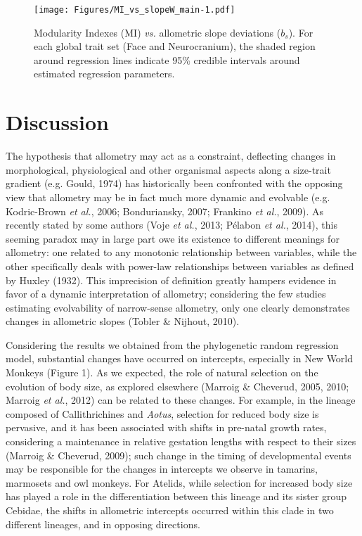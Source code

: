 \documentclass[12pt,]{article}
\begin{document}
\begin{figure}[htbp]
\centering
\texttt{[image: Figures/MI\_vs\_slopeW\_main-1.pdf]}
\caption{Modularity Indexes (MI) \emph{vs.} allometric slope deviations
($b_s$). For each global trait set (Face and Neurocranium), the shaded
region around regression lines indicate 95\% credible intervals around
estimated regression parameters. \label{fig:MI_vs_slopeW_main}}
\end{figure}

\section{Discussion}\label{discussion}

The hypothesis that allometry may act as a constraint, deflecting
changes in morphological, physiological and other organismal aspects
along a size-trait gradient (e.g. Gould, 1974) has historically been
confronted with the opposing view that allometry may be in fact much
more dynamic and evolvable (e.g. Kodric-Brown \emph{et al.}, 2006;
Bonduriansky, 2007; Frankino \emph{et al.}, 2009). As recently stated by
some authors (Voje \emph{et al.}, 2013; Pélabon \emph{et al.}, 2014),
this seeming paradox may in large part owe its existence to different
meanings for allometry: one related to any monotonic relationship
between variables, while the other specifically deals with power-law
relationships between variables as defined by Huxley (1932). This
imprecision of definition greatly hampers evidence in favor of a dynamic
interpretation of allometry; considering the few studies estimating
evolvability of narrow-sense allometry, only one clearly demonstrates
changes in allometric slopes (Tobler \& Nijhout, 2010).

Considering the results we obtained from the phylogenetic random
regression model, substantial changes have occurred on intercepts,
especially in New World Monkeys (Figure 1). As we expected, the role of
natural selection on the evolution of body size, as explored elsewhere
(Marroig \& Cheverud, 2005, 2010; Marroig \emph{et al.}, 2012) can be
related to these changes. For example, in the lineage composed of
Callithrichines and \emph{Aotus}, selection for reduced body size is
pervasive, and it has been associated with shifts in pre-natal growth
rates, considering a maintenance in relative gestation lengths with
respect to their sizes (Marroig \& Cheverud, 2009); such change in the
timing of developmental events may be responsible for the changes in
intercepts we observe in tamarins, marmosets and owl monkeys. For
Atelids, while selection for increased body size has played a role in
the differentiation between this lineage and its sister group Cebidae,
the shifts in allometric intercepts occurred within this clade in two
different lineages, and in opposing directions.
\end{document}
